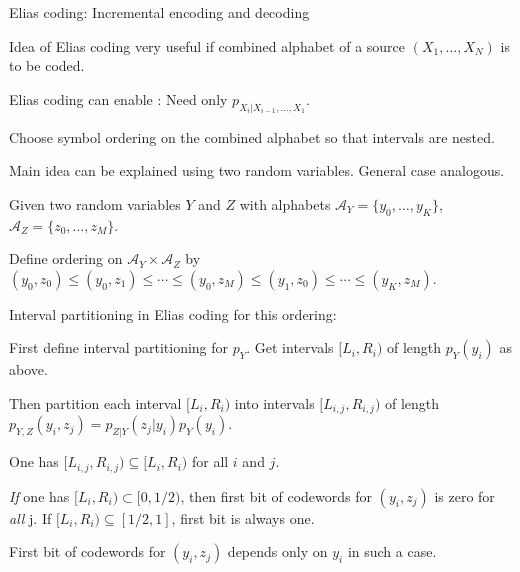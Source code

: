 \begin{frame}{Elias coding: Incremental encoding and decoding}
\bit
\item Idea of Elias coding very useful if combined alphabet of a source $(X_1,\dots,X_N)$ is 
to be coded.
\item  Elias coding can enable : Need only  $p_{X_i|X_{i-1},\dots,X_1}$.
\item{} Choose symbol ordering on the combined alphabet so that intervals are nested.
\eit
\vspace{-0.2cm}
\bit
\item Main idea can be explained using two random variables. General case analogous. 
\item Given two random variables $Y$ and $Z$ with alphabets $\mathcal{A}_Y=\{y_0,\dots,y_K\}$, $\mathcal{A}_Z=\{z_0,\dots,z_M\}$.
\item Define ordering on $\mathcal{A}_Y\times\mathcal{A}_Z$ by $(y_0,z_0)\leq (y_0,z_1)\leq\cdots\leq (y_0,z_M)\leq (y_1,z_0)\leq\cdots\leq (y_K,z_M)$.
\item Interval partitioning in Elias coding for this ordering: 
\bit
\item First define interval partitioning for $p_{Y}$. Get intervals $[L_i,R_i)$ of length $p_Y(y_i)$ as above. 
\item Then partition each interval $[L_i,R_i)$ into intervals $[L_{i,j},R_{i,j})$ of length  $p_{Y,Z}(y_i, z_j)=p_{Z|Y}(z_j|y_i)p_Y(y_i)$.
\item One has $[L_{i,j},R_{i,j})\subseteq [L_i,R_i)$ for all $i$ and $j$. 
\eit
\item \textit{If} one has $[L_i,R_i)\subset [0,1/2)$, then first bit of codewords for $(y_i,z_j)$
is zero for \textit{all} j. If $[L_i,R_i) \subseteq [1/2,1]$, first bit is always one. 
\item[\iarrow ] First bit of codewords for $(y_i,z_j)$ depends only on $y_i$ in such a case. 
\eit

\end{frame}

